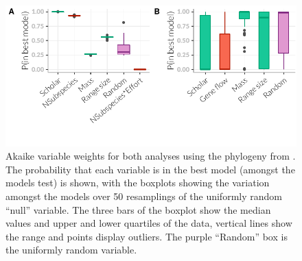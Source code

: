  		





\begin{figure}[t]
\centering
  \includegraphics[width=1\textwidth]{figure/fstITPlots2-1.pdf}
  \caption[Akaike variable weights with alternative phylogeny]{
Akaike variable weights for both analyses using the phylogeny from \cite{jones2005bats}. 
The probability that each variable is in the best model (amongst the models test) is shown, with the boxplots showing the variation amongst the models over 50 resamplings of the uniformly random ``null'' variable. 
The three bars of the boxplot show the median values and upper and lower quartiles of the data, vertical lines show the range and points display outliers. 
The purple ``Random'' box is the uniformly random variable.
}
\label{f:sir}
\end{figure}



















